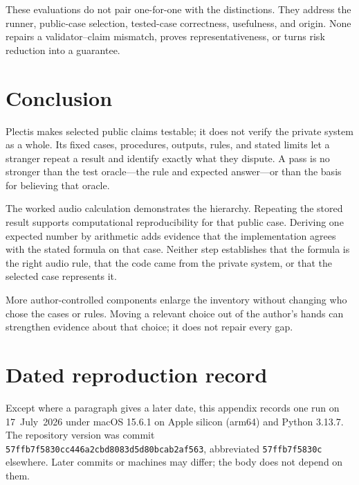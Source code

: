 \documentclass[11pt]{article}
\newcommand{\code}[1]{\texttt{#1}}
\newcommand{\snapshotcommit}{57ffb7f5830cc446a2cbd8083d5d80bcab2af563}
\newcommand{\snapshotshort}{57ffb7f5830c}
\begin{document}
These evaluations do not pair one-for-one with the distinctions. They address
the runner, public-case selection, tested-case correctness, usefulness, and origin.
None repairs a validator--claim mismatch, proves representativeness, or turns
risk reduction into a guarantee.

\section{Conclusion}
\label{sec:conclusion}

Plectis makes selected public claims testable; it does not verify the private
system as a whole. Its fixed cases, procedures, outputs, rules, and stated
limits let a stranger repeat a result and identify exactly what they dispute.
A pass is no stronger than the test oracle---the rule and expected answer---or
than the basis for believing that oracle.

The worked audio calculation demonstrates the hierarchy. Repeating the stored
result supports computational reproducibility for that public case. Deriving
one expected number by arithmetic adds evidence that the implementation agrees
with the stated formula on that case. Neither step establishes that the formula
is the right audio rule, that the code came from the private system, or that the
selected case represents it.

More author-controlled components enlarge the inventory without changing who
chose the cases or rules. Moving a relevant choice out of the author's hands
can strengthen evidence about that choice; it does not repair every gap.

\appendix
\small
\setlength{\parskip}{0pt}

\section{Dated reproduction record}
\label{sec:appendix}

Except where a paragraph gives a later date, this appendix records one run on
17~July~2026 under macOS 15.6.1 on Apple silicon (arm64) and Python 3.13.7.
The repository version was commit \code{\snapshotcommit}, abbreviated
\code{\snapshotshort} elsewhere. Later commits or machines may differ; the body
does not depend on them.
\end{document}
